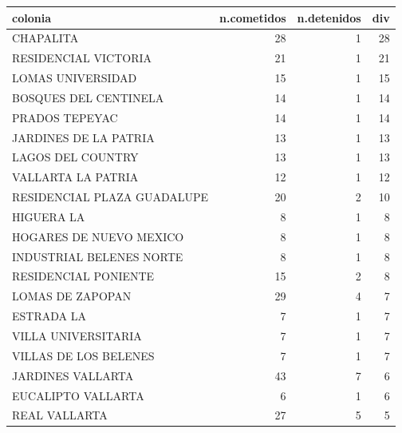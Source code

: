 \begin{table}[ht]
\centering
\begin{tabular}{lrrr}
  \hline
colonia & n.cometidos & n.detenidos & div \\ 
  \hline
CHAPALITA & 28 & 1 & 28 \\ 
  RESIDENCIAL VICTORIA & 21 & 1 & 21 \\ 
  LOMAS UNIVERSIDAD & 15 & 1 & 15 \\ 
  BOSQUES DEL CENTINELA & 14 & 1 & 14 \\ 
  PRADOS TEPEYAC & 14 & 1 & 14 \\ 
  JARDINES DE LA PATRIA & 13 & 1 & 13 \\ 
  LAGOS DEL COUNTRY & 13 & 1 & 13 \\ 
  VALLARTA LA PATRIA & 12 & 1 & 12 \\ 
  RESIDENCIAL PLAZA GUADALUPE & 20 & 2 & 10 \\ 
  HIGUERA LA & 8 & 1 & 8 \\ 
  HOGARES DE NUEVO MEXICO & 8 & 1 & 8 \\ 
  INDUSTRIAL BELENES NORTE & 8 & 1 & 8 \\ 
  RESIDENCIAL PONIENTE & 15 & 2 & 8 \\ 
  LOMAS DE ZAPOPAN & 29 & 4 & 7 \\ 
  ESTRADA LA & 7 & 1 & 7 \\ 
  VILLA UNIVERSITARIA & 7 & 1 & 7 \\ 
  VILLAS DE LOS BELENES & 7 & 1 & 7 \\ 
  JARDINES VALLARTA & 43 & 7 & 6 \\ 
  EUCALIPTO VALLARTA & 6 & 1 & 6 \\ 
  REAL VALLARTA & 27 & 5 & 5 \\ 
   \hline
\end{tabular}
\end{table}


